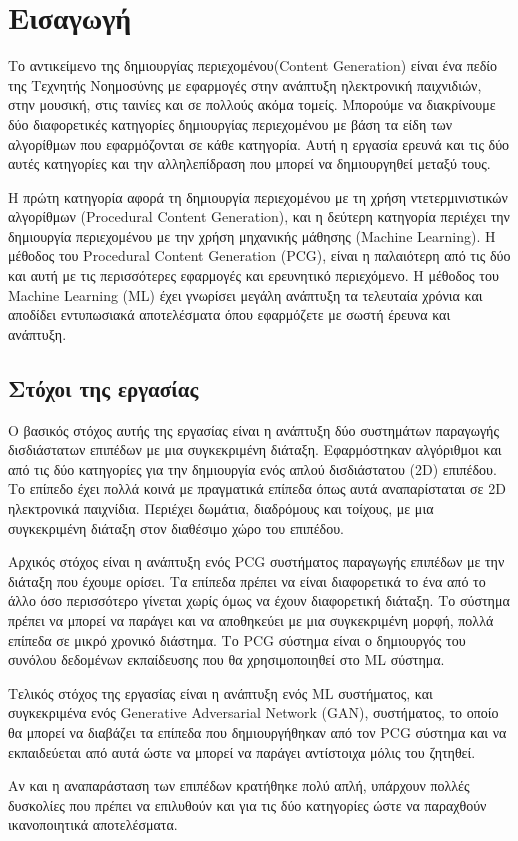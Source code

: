 \chapter{Εισαγωγή}

\par
Το αντικείμενο της δημιουργίας περιεχομένου(Content Generation) είναι ένα πεδίο της Τεχνητής Νοημοσύνης με εφαρμογές στην ανάπτυξη ηλεκτρονική παιχνιδιών, στην μουσική, στις ταινίες και σε πολλούς ακόμα τομείς. Μπορούμε να διακρίνουμε δύο διαφορετικές κατηγορίες δημιουργίας περιεχομένου με βάση τα είδη των αλγορίθμων που εφαρμόζονται σε κάθε κατηγορία. Αυτή η εργασία ερευνά και τις δύο αυτές κατηγορίες και την αλληλεπίδραση που μπορεί να δημιουργηθεί μεταξύ τους.
\par
Η πρώτη κατηγορία αφορά τη δημιουργία περιεχομένου με τη χρήση ντετερμινιστικών αλγορίθμων (Procedural Content Generation), και η δεύτερη κατηγορία περιέχει την δημιουργία περιεχομένου με την χρήση μηχανικής μάθησης (Machine Learning). Η μέθοδος του Procedural Content Generation (PCG), είναι η παλαιότερη από τις δύο και αυτή με τις περισσότερες εφαρμογές και ερευνητικό περιεχόμενο. Η μέθοδος του Machine Learning (ML) έχει γνωρίσει μεγάλη ανάπτυξη τα τελευταία χρόνια και αποδίδει εντυπωσιακά αποτελέσματα όπου εφαρμόζετε με σωστή έρευνα και ανάπτυξη.

\section{Στόχοι της εργασίας}
\par
Ο βασικός στόχος αυτής της εργασίας είναι η ανάπτυξη δύο συστημάτων παραγωγής δισδιάστατων επιπέδων με μια συγκεκριμένη διάταξη. Εφαρμόστηκαν αλγόριθμοι και από τις δύο κατηγορίες για την δημιουργία ενός απλού δισδιάστατου (2D) επιπέδου. Το επίπεδο έχει πολλά κοινά με πραγματικά επίπεδα όπως αυτά αναπαρίσταται σε 2D ηλεκτρονικά παιχνίδια. Περιέχει δωμάτια, διαδρόμους και τοίχους, με μια συγκεκριμένη διάταξη στον διαθέσιμο χώρο του επιπέδου.
\par
Αρχικός στόχος είναι η ανάπτυξη ενός PCG συστήματος παραγωγής επιπέδων με την διάταξη που έχουμε ορίσει. Τα επίπεδα πρέπει να είναι διαφορετικά το ένα από το άλλο όσο περισσότερο γίνεται χωρίς όμως να έχουν διαφορετική διάταξη. Το σύστημα πρέπει να μπορεί να παράγει και να αποθηκεύει με μια συγκεκριμένη μορφή, πολλά επίπεδα σε μικρό χρονικό διάστημα. Το PCG σύστημα είναι ο δημιουργός του συνόλου δεδομένων εκπαίδευσης που θα χρησιμοποιηθεί στο ML σύστημα.
\par
Τελικός στόχος της εργασίας είναι η ανάπτυξη ενός ML συστήματος, και συγκεκριμένα ενός Generative Adversarial Network (GAN), συστήματος, το οποίο θα μπορεί να διαβάζει τα επίπεδα που δημιουργήθηκαν από τον PCG σύστημα και να εκπαιδεύεται από αυτά ώστε να μπορεί να παράγει αντίστοιχα μόλις του ζητηθεί.
\par
Αν και η αναπαράσταση των επιπέδων κρατήθηκε πολύ απλή, υπάρχουν πολλές δυσκολίες που πρέπει να επιλυθούν και για τις δύο κατηγορίες ώστε να παραχθούν ικανοποιητικά αποτελέσματα.

